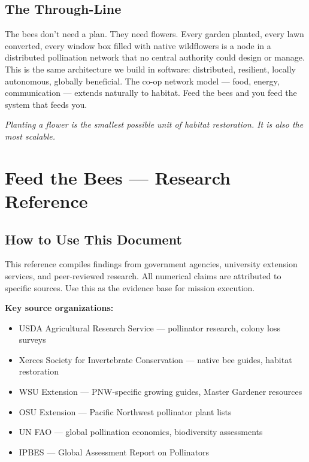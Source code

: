 \documentclass[11pt,letterpaper]{article}
\newcommand{\stageheader}[2]{%
  \noindent\colorbox{#2}{\makebox[\textwidth][l]{%
    \textcolor{white}{\bfseries\sffamily\hspace{6pt}#1\hspace{6pt}}}}%
  \vspace{0.5em}\par%
}
\begin{document}
\subsection{The Through-Line}

The bees don't need a plan. They need flowers. Every garden planted, every lawn converted, every window box filled with native wildflowers is a node in a distributed pollination network that no central authority could design or manage. This is the same architecture we build in software: distributed, resilient, locally autonomous, globally beneficial. The co-op network model --- food, energy, communication --- extends naturally to habitat. Feed the bees and you feed the system that feeds you.

\textit{Planting a flower is the smallest possible unit of habitat restoration. It is also the most scalable.}

\newpage

\stageheader{STAGE 2 --- RESEARCH REFERENCE}{secondary}

\section{Feed the Bees --- Research Reference}

\subsection{How to Use This Document}

This reference compiles findings from government agencies, university extension services, and peer-reviewed research. All numerical claims are attributed to specific sources. Use this as the evidence base for mission execution.

\textbf{Key source organizations:}
\begin{itemize}[nosep]
  \item USDA Agricultural Research Service --- pollinator research, colony loss surveys
  \item Xerces Society for Invertebrate Conservation --- native bee guides, habitat restoration
  \item WSU Extension --- PNW-specific growing guides, Master Gardener resources
  \item OSU Extension --- Pacific Northwest pollinator plant lists
  \item UN FAO --- global pollination economics, biodiversity assessments
  \item IPBES --- Global Assessment Report on Pollinators
\end{itemize}
\end{document}
